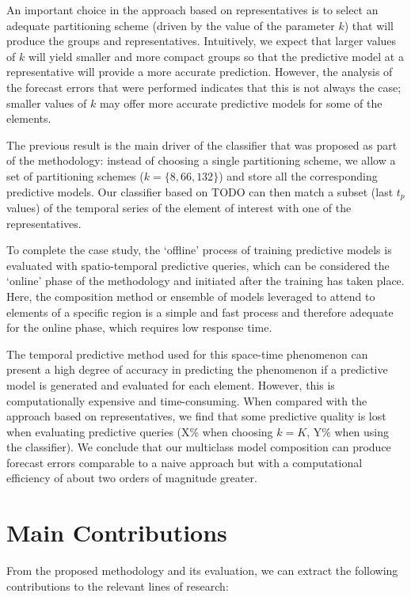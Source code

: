 An important choice in the approach based on representatives is to select an adequate partitioning scheme (driven by the value of the parameter $k$) that will produce the groups and representatives. Intuitively, we expect that larger values of $k$ will yield smaller and more compact groups so that the predictive model at a representative will provide a more accurate prediction. However, the analysis of the forecast errors that were performed indicates that this is not always the case; smaller values of $k$ may offer more accurate predictive models for some of the elements.

The previous result is the main driver of the classifier that was proposed as part of the methodology: instead of choosing a single partitioning scheme, we allow a set of partitioning schemes ($k = \lbrace 8, 66, 132 \rbrace$) and store all the corresponding predictive models. Our classifier based on TODO can then match a subset (last $t_p$ values) of the temporal series of the element of interest with one of the representatives.

To complete the case study, the `offline' process of training predictive models is evaluated with spatio-temporal predictive queries, which can be considered the `online' phase of the methodology and initiated after the training has taken place. Here, the composition method or ensemble of models leveraged to attend to elements of a specific region is a simple and fast process and therefore adequate for the online phase, which requires low response time.

The temporal predictive method used for this space-time phenomenon can present a high degree of accuracy in predicting the phenomenon if a predictive model is generated and evaluated for each element. However, this is computationally expensive and time-consuming. When compared with the approach based on representatives, we find that some predictive quality is lost when evaluating predictive queries (X\% when choosing $k=K$, Y\% when using the classifier). We conclude that our multiclass model composition can produce forecast errors comparable to a naive approach but with a computational efficiency of about two orders of magnitude greater.

\section{Main Contributions}
\label{Sec:MainContributions}

From the proposed methodology and its evaluation, we can extract the following contributions to the relevant lines of research:


